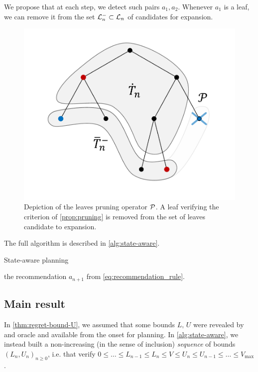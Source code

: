 \documentclass[runningheads]{llncs}
\begin{document}
We propose that at each step, we detect such pairs $a_1, a_2$. Whenever $a_1$ is a leaf, we can remove it from the set $\mathcal{L}_n^-\subset \mathcal{L}_n $ of candidates for expansion.

\begin{figure}[H]
	\centering
	\includegraphics[trim={1.8cm 1.4cm 1.9cm 1.1cm}, clip, width=0.4\linewidth]{img/tree_4}
	\caption{Depiction of the leaves pruning operator $\mathcal{P}$. A leaf verifying the criterion of \autoref{prop:pruning} is removed from the set of leaves candidate to expansion.}
\end{figure}

The full algorithm is described in \autoref{alg:state-aware}.\\
\begin{algorithm}[H]
	\caption{State-aware planning}
	\label{alg:state-aware}
	\SetAlgoLined\DontPrintSemicolon
	\Return the recommendation $a_{n+1}$ from \eqref{eq:recommendation_rule}.\;
\end{algorithm}

\subsection{Main result}

In \autoref{thm:regret-bound-U}, we assumed that some bounds $L,\,U$ were revealed by and oracle and available from the onset for planning. In \autoref{alg:state-aware}, we instead built a non-increasing (in the sense of inclusion) \emph{sequence} of bounds $(L_n,U_n)_{n\geq 0}$, i.e. that verify $0\leq \dots\leq L_{n-1}\leq L_n\leq V\leq U_n\leq U_{n-1}\leq \dots\leq V_{\max}$.
\end{document}
